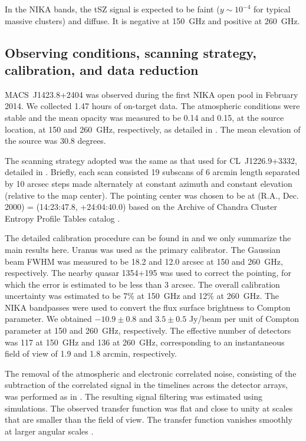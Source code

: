 \documentclass[traditabstract]{aa}
\begin{document}
In the NIKA bands, the tSZ signal is expected to be faint ($y \sim 10^{-4}$ for typical massive clusters) and diffuse. It is negative at 150~GHz and positive at 260~GHz.

\subsection{Observing conditions, scanning strategy, calibration, and data reduction}
\mbox{MACS~J1423.8+2404} was observed during the first NIKA open pool in February 2014. We collected 1.47 hours of on-target data. The atmospheric conditions were stable and the mean opacity was measured to be 0.14 and 0.15, at the source location, at 150 and 260~GHz, respectively, as detailed in \cite{catalano2014}. The mean elevation of the source was 30.8 degrees.

The scanning strategy adopted was the same as that used for \mbox{CL~J1226.9+3332}, detailed in \cite{adam2014}. Briefly, each scan consisted 19 subscans of 6 arcmin length separated by 10 arcsec steps made alternately at constant azimuth and constant elevation (relative to the map center). The pointing center was chosen to be at (R.A., Dec. 2000) = (14:23:47.8, +24:04:40.0) based on the Archive of Chandra Cluster Entropy Profile Tables catalog \citep[ACCEPT;][]{cavagnolo2009}.

The detailed calibration procedure can be found in \cite{adam2014} and we only summarize the main results here. Uranus was used as the primary calibrator. The Gaussian beam FWHM was measured to be 18.2 and 12.0 arcsec at 150 and 260~GHz, respectively. The nearby quasar 1354+195 was used to correct the pointing, for which the error is estimated to be less than 3 arcsec. The overall calibration uncertainty was estimated to be 7\% at 150~GHz and 12\% at 260~GHz. The NIKA bandpasses were used to convert the flux surface brightness to Compton parameter. We obtained $-10.9 \pm 0.8$ and $3.5 \pm 0.5$ Jy/beam per unit of Compton parameter at 150 and 260~GHz, respectively. The effective number of detectors was 117 at 150~GHz and 136 at 260~GHz, corresponding to an instantaneous field of view of 1.9 and 1.8 arcmin, respectively.

The removal of the atmospheric and electronic correlated noise, consisting of the subtraction of the correlated signal in the timelines across the detector arrays, was performed as in \cite{adam2014}. The resulting signal filtering was estimated using simulations. The observed transfer function was flat and close to unity at scales that are smaller than the field of view. The transfer function vanishes smoothly at larger angular scales \citep[see][]{adam2014}.
\end{document}
